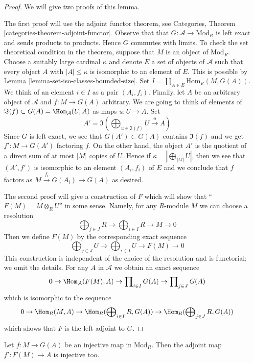 \begin{proof}
We will give two proofs of this lemma.

\medskip\noindent
The first proof will use the adjoint functor theorem, see
Categories, Theorem \ref{categories-theorem-adjoint-functor}.
Observe that that $G : \mathcal{A} \to \text{Mod}_R$ is left exact and sends
products to products. Hence $G$ commutes with limits. To check the set
theoretical condition in the theorem, suppose that $M$ is an object of
$\text{Mod}_R$. Choose a suitably large cardinal $\kappa$ and denote $E$
a set of objects of $\mathcal{A}$ such that every object $A$ with
$|A| \leq \kappa$ is isomorphic to an element of $E$. This is possible
by Lemma \ref{lemma-set-iso-classes-bounded-size}. Set
$I = \coprod_{A \in E} \text{Hom}_R(M, G(A))$.
We think of an element $i \in I$ as a pair $(A_i, f_i)$.
Finally, let $A$ be an arbitrary object of $\mathcal{A}$
and $f : M \to G(A)$ arbitrary. We are going to think of
elements of $\Im(f) \subset G(A) = \Hom_\mathcal{A}(U, A)$
as maps $u : U \to A$. Set
$$
A' = \Im(\bigoplus\nolimits_{u \in \Im(f)} U \xrightarrow{u} A)
$$
Since $G$ is left exact, we see that $G(A') \subset G(A)$
contains $\Im(f)$ and we get $f' : M \to G(A')$ factoring $f$.
On the other hand, the object $A'$ is
the quotient of a direct sum of at most $|M|$ copies of $U$.
Hence if $\kappa = |\bigoplus_{|M|} U|$, then we see that $(A', f')$
is isomorphic to an element $(A_i, f_i)$ of $E$ and we conclude that $f$
factors as $M \xrightarrow{f_i} G(A_i) \to G(A)$ as desired.

\medskip\noindent
The second proof will give a construction of $F$ which will show
that ``$F(M) = M \otimes_R U$'' in some sense. Namely, for any
$R$-module $M$ we can choose a resolution
$$
\bigoplus\nolimits_{j \in J} R \to
\bigoplus\nolimits_{i \in I} R \to
M \to 0
$$
Then we define $F(M)$ by the corresponding exact sequence
$$
\bigoplus\nolimits_{j \in J} U \to
\bigoplus\nolimits_{i \in I} U \to
F(M) \to 0
$$
This construction is independent of the choice of the resolution
and is functorial; we omit the details.
For any $A$ in $\mathcal{A}$ we obtain an exact sequence
$$
0 \to \Hom_\mathcal{A}(F(M), A) \to
\prod\nolimits_{i \in I} G(A) \to
\prod\nolimits_{j \in J} G(A)
$$
which is isomorphic to the sequence
$$
0 \to \Hom_R(M, A) \to
\Hom_R(\bigoplus\nolimits_{i \in I} R, G(A)) \to
\Hom_R(\bigoplus\nolimits_{j \in J} R, G(A))
$$
which shows that $F$ is the left adjoint to $G$.
\end{proof}

\begin{lemma}
\label{lemma-F-G-monos}
Let $f : M \to G(A)$ be an injective map in $\text{Mod}_R$.
Then the adjoint map $f' : F(M) \to A$ is injective too.
\end{lemma}

